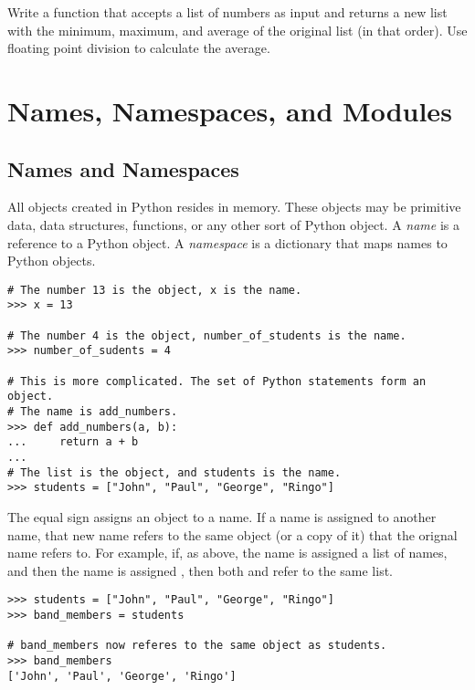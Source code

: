 \begin{problem}
Write a function that accepts a list of numbers as input and returns a new list with the minimum, maximum, and average of the original list (in that order).
Use floating point division to calculate the average.
\end{problem}

\section*{Names, Namespaces, and Modules}

\subsection*{Names and Namespaces}
All objects created in Python resides in memory.
These objects may be primitive data, data structures, functions, or any other sort of Python object.
A \emph{name} is a reference to a Python object.
A \emph{namespace} is a dictionary that maps names to Python objects.

\begin{lstlisting}
# The number 13 is the object, x is the name.
>>> x = 13

# The number 4 is the object, number_of_students is the name.
>>> number_of_sudents = 4

# This is more complicated. The set of Python statements form an object.
# The name is add_numbers.
>>> def add_numbers(a, b):
...     return a + b
... 
# The list is the object, and students is the name.
>>> students = ["John", "Paul", "George", "Ringo"]
\end{lstlisting}

The equal sign assigns an object to a name.
If a name is assigned to another name, that new name refers to the same object (or a copy of it) that the orignal name refers to.
For example, if, as above, the name  is assigned a list of names, and then the name  is assigned , then both  and  refer to the same list.

\begin{lstlisting}
>>> students = ["John", "Paul", "George", "Ringo"]
>>> band_members = students

# band_members now referes to the same object as students.
>>> band_members
['John', 'Paul', 'George', 'Ringo']
\end{lstlisting}


